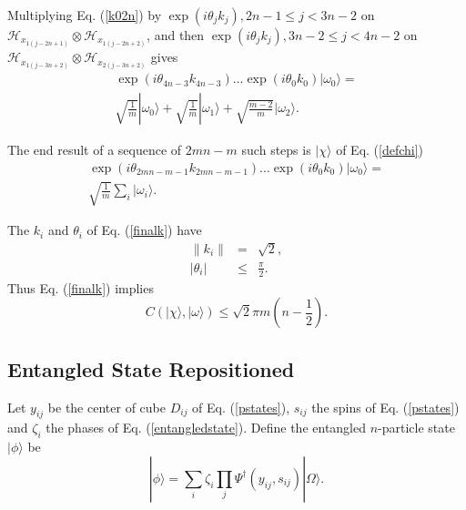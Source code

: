 \documentclass[twocolumn,amsmath,amssymb]{revtex4-1}
\begin{document}
Multiplying Eq. (\ref{k02n}) by $\exp(i\theta_jk_j), 2n-1 \le j < 3n-2$ on
$\mathcal{H}_{x_{1(j-2n+1)}} \otimes \mathcal{H}_{x_{1(j-2n +2)}}$, 
and then $\exp(i\theta_jk_j), 3n -2 \le j < 4n -2$ on
$\mathcal{H}_{x_{1(j-3n+2)}} \otimes \mathcal{H}_{x_{2(j-3n+2)}}$ gives
\begin{multline}
\label{k04n}
\exp( i \theta_{4n-3} k_{4n-3}) ... \exp( i \theta_0 k_0) |\omega_0 \rangle  = \\
\sqrt{\frac{1}{m}} |\omega_0 \rangle  +
\sqrt{\frac{1}{m}} |\omega_1 \rangle  + 
\sqrt{\frac{m - 2}{m}} |\omega_2 \rangle .
\end{multline}

The end result of a sequence of $2mn - m$ such steps is
$|\chi \rangle $ of Eq. (\ref{defchi})
\begin{multline}
\label{finalk}
\exp( i \theta_{2mn-m-1} k_{2mn-m-1}) ... \exp( i \theta_0 k_0) |\omega_0 \rangle  = \\
\sqrt{\frac{1}{m}} \sum_i |\omega_i \rangle .
\end{multline}

The $k_i$ and $\theta_i$ of Eq. (\ref{finalk}) have
\begin{subequations}
\begin{eqnarray}
\label{normfinalk}
\parallel k_i \parallel & = & \sqrt{2},\\
\label{normfinaltheta}
| \theta_i | & \le & \frac{\pi}{2}.
\end{eqnarray}
\end{subequations}
Thus  Eq. (\ref{finalk}) implies
\begin{equation}
\label{deltac}
C( |\chi \rangle , |\omega \rangle ) \le \sqrt{2} \pi m (n - \frac{1}{2}).
\end{equation}


\subsection{\label{app:subsectionsecond}Entangled State Repositioned}

Let $y_{ij}$ be the center of cube $D_{ij}$ of Eq. (\ref{pstates}), $s_{ij}$ the spins of Eq. (\ref{pstates})
and $\zeta_i$ the phases of Eq. (\ref{entangledstate}). Define the entangled $n$-particle state
$|\phi \rangle $ be
\begin{equation}
\label{phinpoints}
|\phi \rangle  = \sum_{i} \zeta_i \prod_j \Psi^{\dagger}( y_{ij}, s_{ij}) |\Omega \rangle .
\end{equation}
\end{document}
